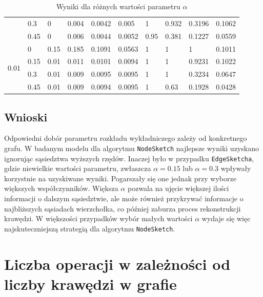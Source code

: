 \begin{table}[!ht]
\begin{tabular}{|l|l|l|l|l|l|l|l|l|l|}
            & 0.3 & 0 & 0.004 & 0.0042 & 0.005 & 1 & 0.932 & 0.3196 & 0.1062 \\ \cline{2-10}
            & 0.45 & 0 & 0.006 & 0.0044 & 0.0052 & 0.95 & 0.381 & 0.1227 & 0.0559 \\ \hline\hline
        \multirow{4}{*}{0.01}    & 0 & 0.15 & 0.185 & 0.1091 & 0.0563 & 1 & 1 & 1 & 0.1011 \\ \cline{2-10}
            & 0.15 & 0.01 & 0.011 & 0.0101 & 0.0094 & 1 & 1 & 0.9231 & 0.1022 \\ \cline{2-10}
            & 0.3 & 0.01 & 0.009 & 0.0095 & 0.0095 & 1 & 1 & 0.3234 & 0.0647 \\ \cline{2-10}
            & 0.45 & 0.01 & 0.009 & 0.0094 & 0.0095 & 1 & 0.63 & 0.1928 & 0.0428 \\ \hline
        \end{tabular}
        \caption{Wyniki dla różnych wartości parametru $\alpha$}
        \label{tab:alpha}
    \end{table}

    \subsection{Wnioski}
    Odpowiedni dobór parametru rozkładu wykładniczego zależy od konkretnego grafu. W badanym modelu dla algorytmu \texttt{NodeSketch} najlepsze wyniki uzyskano ignorując sąsiedztwa wyższych rzędów. Inaczej było w przypadku \texttt{EdgeSketcha}, gdzie niewielkie wartości parametru, zwłaszcza $\alpha = 0.15$ lub $\alpha = 0.3$ wpływały korzystnie na uzyskiwane wyniki. Pogarszały się one jednak przy wyborze większych współczynników. Większa $\alpha$ pozwala na ujęcie większej ilości informacji o dalszym sąsiedztwie, ale może również przykrywać informacje o najbliższych sąsiadach wierzchołka, co później zaburza proces rekonstrukcji krawędzi. W większości przypadków wybór małych wartości $\alpha$ wydaje się więc najskuteczniejszą strategią dla algorytmu \texttt{NodeSketch}. 

\section{Liczba operacji w zależności od liczby krawędzi w grafie}
\label{sec:performance}

